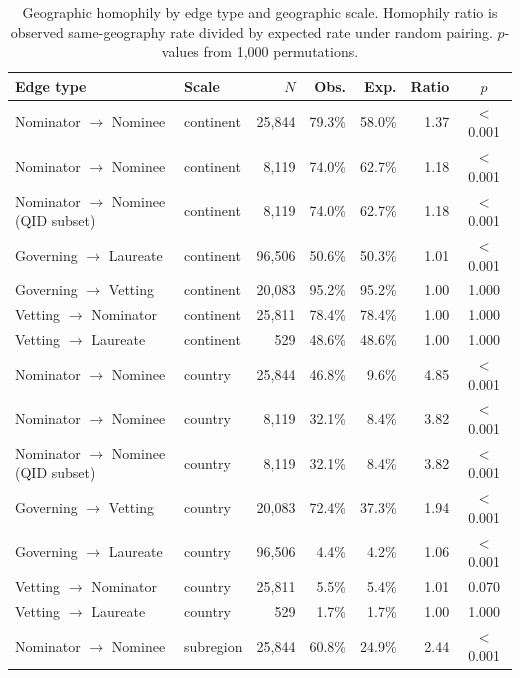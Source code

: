 \begin{table}[ht]
\centering
\caption{Geographic homophily by edge type and geographic scale. Homophily ratio is observed same-geography rate divided by expected rate under random pairing. $p$-values from 1{,}000 permutations.}
\label{tab:homophily_edge_type}
\small
\begin{tabular}{llrrrrc}
\toprule
Edge type & Scale & $N$ & Obs. & Exp. & Ratio & $p$ \\
\midrule
Nominator $\rightarrow$ Nominee & continent & 25,844 & 79.3\% & 58.0\% & 1.37 & $<$0.001 \\
Nominator $\rightarrow$ Nominee & continent & 8,119 & 74.0\% & 62.7\% & 1.18 & $<$0.001 \\
Nominator $\rightarrow$ Nominee (QID subset) & continent & 8,119 & 74.0\% & 62.7\% & 1.18 & $<$0.001 \\
Governing $\rightarrow$ Laureate & continent & 96,506 & 50.6\% & 50.3\% & 1.01 & $<$0.001 \\
Governing $\rightarrow$ Vetting & continent & 20,083 & 95.2\% & 95.2\% & 1.00 & 1.000 \\
Vetting $\rightarrow$ Nominator & continent & 25,811 & 78.4\% & 78.4\% & 1.00 & 1.000 \\
Vetting $\rightarrow$ Laureate & continent & 529 & 48.6\% & 48.6\% & 1.00 & 1.000 \\
Nominator $\rightarrow$ Nominee & country & 25,844 & 46.8\% & 9.6\% & 4.85 & $<$0.001 \\
Nominator $\rightarrow$ Nominee & country & 8,119 & 32.1\% & 8.4\% & 3.82 & $<$0.001 \\
Nominator $\rightarrow$ Nominee (QID subset) & country & 8,119 & 32.1\% & 8.4\% & 3.82 & $<$0.001 \\
Governing $\rightarrow$ Vetting & country & 20,083 & 72.4\% & 37.3\% & 1.94 & $<$0.001 \\
Governing $\rightarrow$ Laureate & country & 96,506 & 4.4\% & 4.2\% & 1.06 & $<$0.001 \\
Vetting $\rightarrow$ Nominator & country & 25,811 & 5.5\% & 5.4\% & 1.01 & 0.070 \\
Vetting $\rightarrow$ Laureate & country & 529 & 1.7\% & 1.7\% & 1.00 & 1.000 \\
Nominator $\rightarrow$ Nominee & subregion & 25,844 & 60.8\% & 24.9\% & 2.44 & $<$0.001 \\
\bottomrule
\end{tabular}
\end{table}
